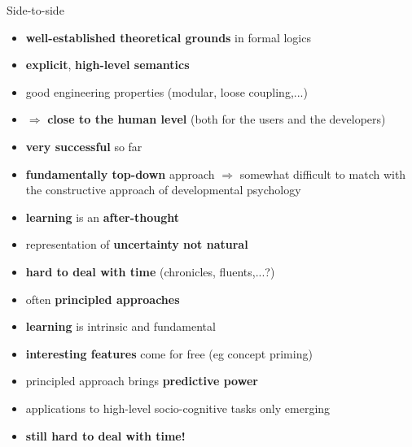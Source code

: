 \documentclass[compress]{beamer}
\begin{document}
\begin{frame}{Side-to-side}

    \scriptsize
    \begin{multicols}{2}


    \begin{itemize}
        \item {\bf well-established theoretical grounds} in formal logics
        \item {\bf explicit}, {\bf high-level semantics}
        \item good engineering properties (modular, loose coupling,...)
        \item $\Rightarrow$ {\bf close to the human level} (both for the users and the developers)
        \item {\bf very successful} so far
        \item {\bf fundamentally top-down} approach $\Rightarrow$ somewhat difficult to match with
            the constructive approach of developmental psychology
        \item {\bf learning} is an {\bf after-thought}
        \item representation of {\bf uncertainty not natural}
        \item {\bf hard to deal with time} (chronicles, fluents,...?)
    \end{itemize}

    \columnbreak


    \begin{itemize}
        \item often {\bf principled approaches}
        \item {\bf learning} is intrinsic and fundamental
        \item {\bf interesting features} come for free (eg concept priming)
        \item principled approach brings {\bf predictive power}
        \item applications to high-level socio-cognitive tasks only emerging
        \item {\bf still hard to deal with time!}
    \end{itemize}

    \end{multicols}
\end{frame}
\end{document}
